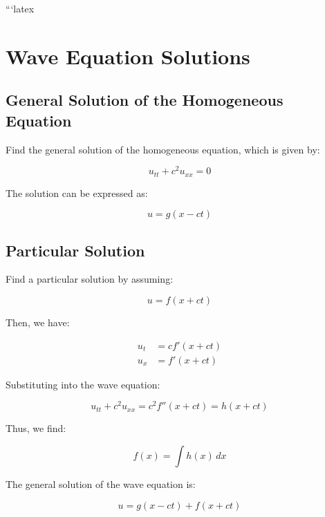 ```latex
\section*{Wave Equation Solutions}

\subsection*{General Solution of the Homogeneous Equation}

Find the general solution of the homogeneous equation, which is given by:

\begin{equation}
    u_{tt} + c^2 u_{xx} = 0
\end{equation}

The solution can be expressed as:

\begin{equation}
    u = g(x - ct)
\end{equation}

\subsection*{Particular Solution}

Find a particular solution by assuming:

\begin{equation}
    u = f(x + ct)
\end{equation}

Then, we have:

\begin{align}
    u_t &= c f'(x + ct) \\
    u_x &= f'(x + ct)
\end{align}

Substituting into the wave equation:

\begin{equation}
    u_{tt} + c^2 u_{xx} = c^2 f''(x + ct) = h(x + ct)
\end{equation}

Thus, we find:

\begin{equation}
    f(x) = \int h(x) \, dx
\end{equation}

The general solution of the wave equation is:

\begin{equation}
    u = g(x - ct) + f(x + ct)
\end{equation}

